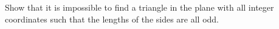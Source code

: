 Show that it is impossible to find a triangle in the plane with all integer coordinates such that the lengths of the sides are all odd.